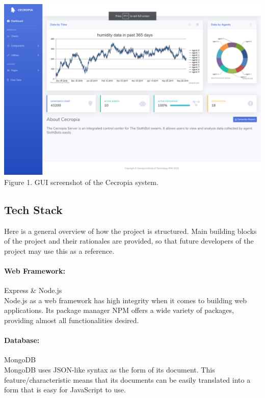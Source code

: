 \documentclass{article}
\begin{document}
\paragraph{}
\paragraph{}
\begin{center}
  \includegraphics[scale=0.5]{sample}
  Figure 1. GUI screenshot of the Cecropia system.
\end{center}



\newpage
\subsection{Tech Stack}
Here is a general overview of how the project is structured. Main building blocks of the project and their rationales are provided, 
so that future developers of the project may use this as a reference.
\paragraph{Web Framework:} Express \& Node.js\\
Node.js as a web framework has high integrity when it comes to building web applications. Its package manager 
NPM offers a wide variety of packages, providing almost all functionalities desired. 
\paragraph{Database:} MongoDB\\
MongoDB uses JSON-like syntax as the form of its document. This feature/characteristic means that its documents
can be easily translated into a form that is easy for JavaScript to use.
\end{document}
